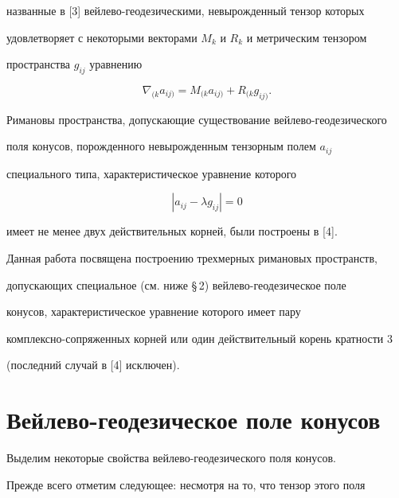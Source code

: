 названные в [3] вейлево-геодезическими, невырожденный тензор которых 


удовлетворяет с некоторыми векторами $M_k$ и $R_k$ и метрическим тензором 


пространства $g_{ij}$ уравнению 


\begin{equation} 


\nabla_{(k}a_{ij)}=M_{(k}a_{ij)}+R_{(k}g_{ij)}. 


\end{equation} 


Римановы пространства, допускающие существование вейлево-геодезического 


поля конусов, порожденного невырожденным тензорным полем $a_{ij}$ 


специального типа, характеристическое уравнение которого 


\begin{equation} 


|a_{ij}-\lambda g_{ij}|=0 


\end{equation} 


имеет не менее двух действительных корней, были построены в [4]. 


 


Данная работа посвящена построению трехмерных римановых пространств, 


допускающих специальное (см. ниже \S\,2) вейлево-геодезическое поле 


конусов, характеристическое уравнение которого имеет пару 


комплексно-сопряженных корней или один действительный корень кратности 3 


(последний случай в [4] исключен). 


 


 


\section{Вейлево-геодезическое поле конусов} 


 


Выделим некоторые свойства вейлево-геодезического поля конусов. 


 


Прежде всего отметим следующее: несмотря на то, что тензор этого поля 


